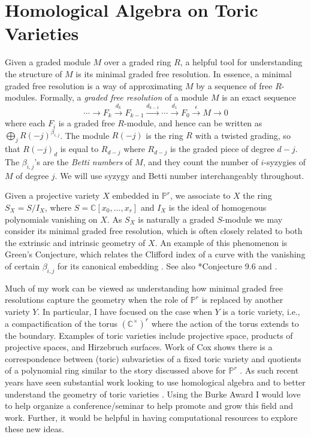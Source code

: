 \documentclass[11pt,reqno]{amsart}
\theoremstyle{remark}
\newcommand{\C}{\mathbb{C}}
\renewcommand{\P}{\mathbb{P}}
\begin{document}
\section{Homological Algebra on Toric Varieties}

Given a graded module $M$ over a graded ring $R$, a helpful tool for understanding the structure of $M$ is its minimal graded free resolution. In essence, a minimal graded free resolution is a way of approximating $M$ by a sequence of free $R$-modules. Formally, a \textit{graded free resolution} of a module $M$ is an exact sequence 
\[
\cdots \xrightarrow{} F_{k} \xrightarrow{d_{k}} F_{k-1} \xrightarrow{d_{k-1}} \cdots \xrightarrow{d_{1}} F_{0}\xrightarrow{\epsilon}M\xrightarrow{} 0
\]
where each $F_{i}$ is a graded free $R$-module, and hence can be written as $\bigoplus_{j}R(-j)^{\beta_{i,j}}$. The module $R(-j)$ is the ring $R$ with a twisted grading, so that $R(-j)_{d}$ is equal to $R_{d-j}$ where $R_{d-j}$ is the graded piece of degree $d-j$. The $\beta_{i,j}$'s are the \textit{Betti numbers} of $M$, and they count the number of $i$-syzygies of $M$ of degree $j$. We will use syzygy and Betti number interchangeably throughout. 

Given a projective variety $X$ embedded in $\P^r$, we associate to $X$ the ring $S_X=S/I_X$, where $S=\C[x_0,\ldots,x_r]$ and $I_X$ is the ideal of homogenous polynomials vanishing on $X$. As $S_X$ is naturally a graded $S$-module we may consider its minimal graded free resolution, which is often closely related to both the extrinsic and intrinsic geometry of $X$.  An example of this phenomenon
 is Green's Conjecture, which relates the Clifford index of a curve with the vanishing of certain $\beta_{i,j}$ for its canonical embedding \cite{voisin02, voisin05, aproduFarkas19}. See also \cite{eisenbud05}*{Conjecture 9.6} and \cite{schreyer86, bayerEisenbud91,farkasPopa05,farkasKemeny16}.
 
 Much of my work can be viewed as understanding how minimal graded free resolutions capture the geometry when the role of $\P^{r}$ is replaced by another variety $Y$. In particular, I have focused on the case when $Y$ is a toric variety, i.e., a compactification of the torus $(\C^{\times})^{r}$ where the action of the torus extends to the boundary. Examples of toric varieties include projective space, products of projective spaces, and Hirzebruch surfaces. Work of Cox shows there is a correspondence between (toric) subvarieties of a fixed toric variety and quotients of a polynomial ring similar to the story discussed above for $\P^{r}$ \cite{cox95}. As such recent years have seen substantial work looking to use homological algebra and to better understand the geometry of toric varieties \cite{almousaBruce19,berkeschErmanSmith17,brownErman22,EES15,maclaganSmith04,maclaganSmith05}. Using the Burke Award I would love to help organize a conference/seminar to help promote and grow this field and work. Further, it would be helpful in having computational resources to explore these new ideas. 
\end{document}
